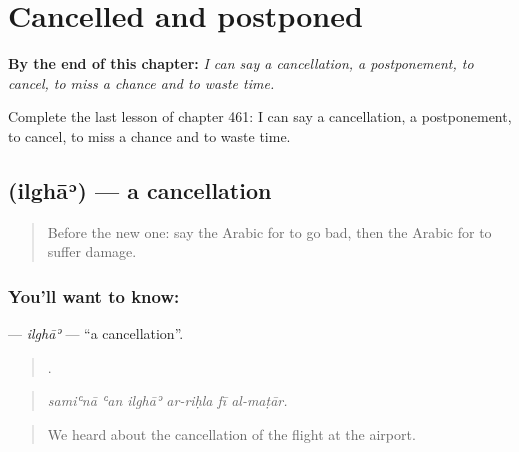 
\chapter{Cancelled and postponed}
\label{ch:ar-cancelled-and-postponed}

\begin{chapteropening}
\textbf{By the end of this chapter:} \emph{I can say a cancellation, a postponement, to cancel, to miss a chance and to waste time.}

Complete the last lesson of chapter 461: I can say a cancellation, a postponement, to cancel, to miss a chance and to waste time.
\end{chapteropening}

\section[\texorpdfstring{\ar{إلغاء} (ilghāʾ)}{إلغاء (ilghāʾ)}]{ (ilghāʾ) — a cancellation}

\label{lesson:AR-C461-ilgha}



\begin{quote}
Before the new one: say the Arabic for to go bad, then the Arabic for to suffer damage.
\end{quote}

\subsection*{You'll want to know: }
\textbf{} — \emph{ilghāʾ} — \textquotedblleft{}a cancellation\textquotedblright{}.

\begin{quote}
     .
\end{quote}

\begin{quote}
\emph{samiʿnā ʿan ilghāʾ ar-riḥla fī al-maṭār.}
\end{quote}

\begin{quote}
We heard about the cancellation of the flight at the airport.
\end{quote}

